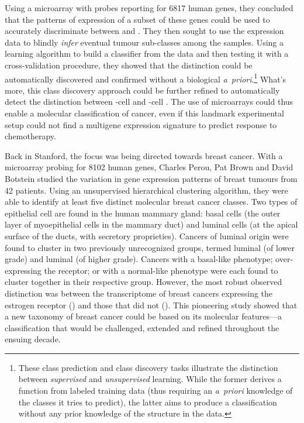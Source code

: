 Using a microarray with probes reporting for 6817 human genes, they concluded
that the patterns of expression of a subset of these genes could be used to
accurately discriminate between  and .  They then
sought to use the expression data to blindly \emph{infer} eventual tumour
\mbox{sub-classes} among the samples.  Using a learning algorithm to build a
classifier from the data and then testing it with a cross-validation procedure,
they showed that the \mbox{} distinction could be
automatically discovered and confirmed without a biological \mbox{\emph{a
    priori}}.\footnote{These class prediction and class discovery tasks
  illustrate the distinction between \emph{supervised} and \emph{unsupervised}
  learning.  While the former derives a function from labeled training data
  (thus requiring an \mbox{\emph{a priori}} knowledge of the classes it tries to
  predict), the latter aims to produce a classification without any prior
  knowledge of the structure in the data.}  What's more, this class discovery
approach could be further refined to automatically detect the distinction
between \mbox{-cell} and \mbox{-cell} .
The use of microarrays could thus enable a molecular classification of cancer,
even if this landmark experimental setup could not find a multigene expression
signature to predict response to chemotherapy.

Back in Stanford, the focus was being directed towards breast cancer.  With a
microarray probing for \num{8102} human genes, Charles Perou, Pat Brown and
David Botstein studied the variation in gene expression patterns of breast
tumours from 42 patients.\cite{perou_molecular_2000} Using an unsupervised
hierarchical clustering algorithm, they were able to identify at least five
distinct molecular breast cancer classes.  Two types of epithelial cell are
found in the human mammary gland: basal cells (the outer layer of myoepithelial
cells in the mammary duct) and luminal cells (at the apical surface of the
ducts, with secretory proprieties).  Cancers of luminal origin were found to
cluster in two previously unrecognized groups, termed luminal  (of
lower grade) and luminal  (of higher grade).  Cancers with a
\mbox{basal-like} phenotype; \mbox{over-expressing} the 
receptor; or with a normal-like phenotype were each found to cluster together in
their respective group.  However, the most robust observed distinction was
between the transcriptome of breast cancers expressing the estrogen receptor
() and those that did not ().  This pioneering
study showed that a new taxonomy of breast cancer could be based on its
molecular features---a classification that would be challenged, extended and
refined throughout the ensuing
decade.\cite{sorlie_gene_2001,sorlie_repeated_2003,hu_molecular_2006,pusztai_molecular_2006,rakha_basal-like_2008,parker_supervised_2009,gusterson_basal-like_2009,weigelt_contribution_2010,prat_deconstructing_2011}

